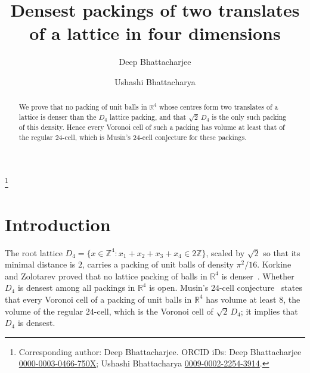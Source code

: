 \documentclass[11pt]{amsart}
\theoremstyle{definition}
\theoremstyle{remark}
\numberwithin{equation}{section}
\numberwithin{table}{section}
\numberwithin{figure}{section}
\newcommand{\R}{\mathbb{R}}
\newcommand{\Z}{\mathbb{Z}}
\begin{document}
\title[Packings of two lattice translates in four dimensions]{Densest packings of two translates\\ of a lattice in four dimensions}

\author{Deep Bhattacharjee}
\address{Formerly, Electro-Gravitational Space Propulsion Laboratory (EGSPL),\newline Bhubaneswar, Odisha 751030, India}
\author{Ushashi Bhattacharya}
\address{Formerly, National Taiwan University, Taipei 106319, Taiwan}
\thanks{Corresponding author: Deep Bhattacharjee. ORCID iDs: Deep Bhattacharjee \href{https://orcid.org/0000-0003-0466-750X}{\mbox{0000-0003-0466-750X}}; Ushashi Bhattacharya \href{https://orcid.org/0009-0002-2254-3914}{\mbox{0009-0002-2254-3914}}.}


\begin{abstract}
We prove that no packing of unit balls in $\R^4$ whose centres form two translates of a lattice is denser than the $D_4$ lattice packing, and that $\sqrt2\,D_4$ is the only such packing of this density. Hence every Voronoi cell of such a packing has volume at least that of the regular $24$-cell, which is Musin's $24$-cell conjecture for these packings.
\end{abstract}

\maketitle

\section{Introduction}

The root lattice $D_4=\{x\in\Z^4:x_1+x_2+x_3+x_4\in2\Z\}$, scaled by $\sqrt2$ so that its minimal distance is $2$, carries a packing of unit balls of density $\pi^2/16$. Korkine and Zolotarev proved that no lattice packing of balls in $\R^4$ is denser~\cite{KZ1877}. Whether $D_4$ is densest among all packings in $\R^4$ is open. Musin's $24$-cell conjecture~\cite{Musin2018} states that every Voronoi cell of a packing of unit balls in $\R^4$ has volume at least $8$, the volume of the regular $24$-cell, which is the Voronoi cell of $\sqrt2\,D_4$; it implies that $D_4$ is densest.
\end{document}
